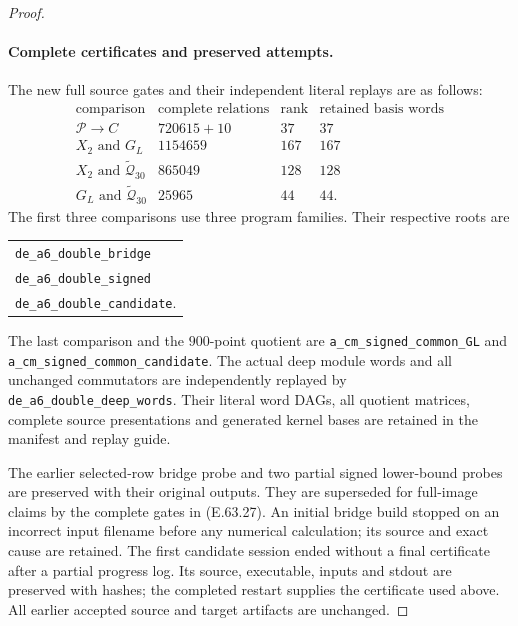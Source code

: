 \begin{proof}
\paragraph{Complete certificates and preserved attempts.}
The new full source gates and their independent
literal replays are as follows:
\[
 \begin{array}{l|r|r|l}
 \text{comparison}&\text{complete relations}&\text{rank}
                                      &\text{retained basis words}\\\hline
 \mathcal P\to C&720615+10&37&37\\
 X_2\text{ and }G_L&1154659&167&167\\
 X_2\text{ and }\widetilde{\mathcal Q}_{30}&865049&128&128\\
 G_L\text{ and }\widetilde{\mathcal Q}_{30}&25965&44&44.
 \end{array}
 \tag{E.63.27}
\]
The first three comparisons use three program families.
Their respective roots are
\begin{center}
\begin{tabular}{l}
\texttt{de\_a6\_double\_bridge}\\
\texttt{de\_a6\_double\_signed}\\
\texttt{de\_a6\_double\_candidate}.
\end{tabular}
\end{center}
The last comparison and the $900$-point quotient
are \texttt{a\_cm\_signed\_common\_GL} and
\texttt{a\_cm\_signed\_common\_candidate}.
The actual deep module words and all unchanged
commutators are independently replayed by
\texttt{de\_a6\_double\_deep\_words}.
Their literal word DAGs, all quotient matrices,
complete source presentations and generated
kernel bases are retained in the manifest and
replay guide.

The earlier selected-row bridge probe and two
partial signed lower-bound probes are preserved
with their original outputs. They are superseded
for full-image claims by the complete gates in
\textup{(E.63.27)}. An initial bridge build stopped
on an incorrect input filename before any numerical
calculation; its source and exact cause are retained.
The first candidate session ended without a final
certificate after a partial progress log. Its
source, executable, inputs and stdout are preserved
with hashes; the completed restart supplies the
certificate used above. All earlier accepted
source and target artifacts are unchanged.



\end{proof}
